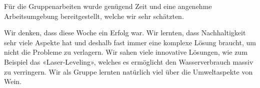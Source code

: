 Für die Gruppenarbeiten wurde genügend Zeit und eine angenehme Arbeitsumgebung bereitgestellt,  welche wir sehr schätzten. 

Wir denken, dass diese Woche ein Erfolg war. Wir lernten, dass Nachhaltigkeit sehr viele Aspekte hat
und deshalb fast immer eine komplexe Lösung braucht, um nicht die Probleme zu verlagern. Wir sahen
viele innovative Lösungen, wie zum Beispiel das «Laser-Leveling»,  welches es ermöglicht den Wasserverbrauch massiv zu verringern. Wir als Gruppe lernten natürlich viel über die Umweltaspekte von Wein.
